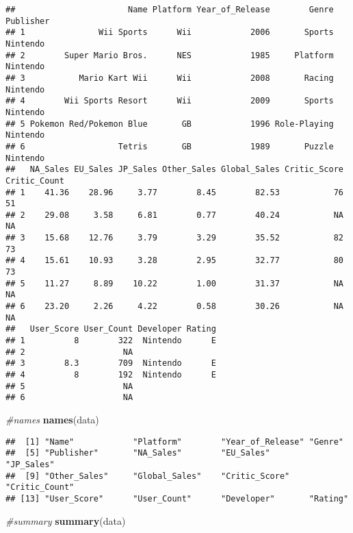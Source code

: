 \documentclass[]{article}
\newenvironment{Shaded}{\begin{snugshade}}{\end{snugshade}}
\newcommand{\CommentTok}[1]{\textcolor[rgb]{0.56,0.35,0.01}{\textit{#1}}}
\newcommand{\KeywordTok}[1]{\textcolor[rgb]{0.13,0.29,0.53}{\textbf{#1}}}
\newcommand{\NormalTok}[1]{#1}
\begin{document}
\begin{verbatim}
##                       Name Platform Year_of_Release        Genre Publisher
## 1               Wii Sports      Wii            2006       Sports  Nintendo
## 2        Super Mario Bros.      NES            1985     Platform  Nintendo
## 3           Mario Kart Wii      Wii            2008       Racing  Nintendo
## 4        Wii Sports Resort      Wii            2009       Sports  Nintendo
## 5 Pokemon Red/Pokemon Blue       GB            1996 Role-Playing  Nintendo
## 6                   Tetris       GB            1989       Puzzle  Nintendo
##   NA_Sales EU_Sales JP_Sales Other_Sales Global_Sales Critic_Score Critic_Count
## 1    41.36    28.96     3.77        8.45        82.53           76           51
## 2    29.08     3.58     6.81        0.77        40.24           NA           NA
## 3    15.68    12.76     3.79        3.29        35.52           82           73
## 4    15.61    10.93     3.28        2.95        32.77           80           73
## 5    11.27     8.89    10.22        1.00        31.37           NA           NA
## 6    23.20     2.26     4.22        0.58        30.26           NA           NA
##   User_Score User_Count Developer Rating
## 1          8        322  Nintendo      E
## 2                    NA                 
## 3        8.3        709  Nintendo      E
## 4          8        192  Nintendo      E
## 5                    NA                 
## 6                    NA
\end{verbatim}

\begin{Shaded}
\begin{Highlighting}[]
\CommentTok{#names}
\KeywordTok{names}\NormalTok{(data)}
\end{Highlighting}
\end{Shaded}

\begin{verbatim}
##  [1] "Name"            "Platform"        "Year_of_Release" "Genre"          
##  [5] "Publisher"       "NA_Sales"        "EU_Sales"        "JP_Sales"       
##  [9] "Other_Sales"     "Global_Sales"    "Critic_Score"    "Critic_Count"   
## [13] "User_Score"      "User_Count"      "Developer"       "Rating"
\end{verbatim}

\begin{Shaded}
\begin{Highlighting}[]
\CommentTok{#summary}
 \KeywordTok{summary}\NormalTok{(data)}
\end{Highlighting}
\end{Shaded}
\end{document}

